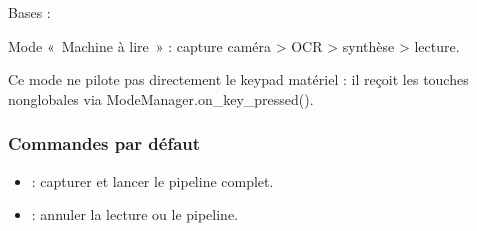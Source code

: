 \documentclass[letterpaper,10pt,french]{sphinxmanual}
\begin{document}
\begin{fulllineitems}
\label{\detokenize{api/modes:modes.mode_reading_machine.ModeReadingMachine}}
\pysigstartsignatures
\pysiglinewithargsret
{}
{\sphinxparamcomma {}\sphinxparamcomma {}\sphinxparamcomma {}\sphinxparamcomma {}}
{}
\pysigstopsignatures
\sphinxAtStartPar
Bases : {\hyperref[\detokenize{api/core:core.mode_base.Mode}]{}}

\sphinxAtStartPar
Mode « Machine à lire » : capture caméra \sphinxhyphen{}\textgreater{} OCR \sphinxhyphen{}\textgreater{} synthèse \sphinxhyphen{}\textgreater{} lecture.

\sphinxAtStartPar
Ce mode ne pilote pas directement le keypad matériel : il reçoit les
touches non\sphinxhyphen{}globales via ModeManager.on\_key\_pressed().


\subsubsection{Commandes par défaut}
\label{\detokenize{api/modes:commandes-par-defaut}}\begin{itemize}
\item {} 
\sphinxAtStartPar
{} : capturer et lancer le pipeline complet.

\item {} 
\sphinxAtStartPar
{} : annuler la lecture ou le pipeline.


\end{itemize}
\end{fulllineitems}
\end{document}
